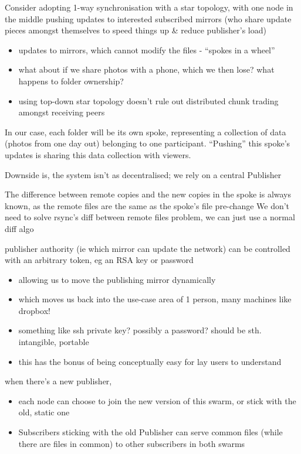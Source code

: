 \documentclass[12pt,a4paper,]{adreport}
\begin{document}
Consider adopting 1-way synchronisation with a star topology, with one
node in the middle pushing updates to interested subscribed mirrors (who
share update pieces amongst themselves to speed things up \& reduce
publisher's load)

\begin{itemize}
\itemsep1pt\parskip0pt
\item
  updates to mirrors, which cannot modify the files - ``spokes in a
  wheel''
\item
  what about if we share photos with a phone, which we then lose? what
  happens to folder ownership?
\item
  using top-down star topology doesn't rule out distributed chunk
  trading amongst receiving peers
\end{itemize}

In our case, each folder will be its own spoke, representing a
collection of data (photos from one day out) belonging to one
participant. ``Pushing'' this spoke's updates is sharing this data
collection with viewers.

Downside is, the system isn't as decentralised; we rely on a central
Publisher

The difference between remote copies and the new copies in the spoke is
always known, as the remote files are the same as the spoke's file
pre-change We don't need to solve rsync's diff between remote files
problem, we can just use a normal diff algo

publisher authority (ie which mirror can update the network) can be
controlled with an arbitrary token, eg an RSA key or password

\begin{itemize}
\itemsep1pt\parskip0pt
\item
  allowing us to move the publishing mirror dynamically
\item
  which moves us back into the use-case area of 1 person, many machines
  like dropbox!
\item
  something like ssh private key? possibly a password? should be sth.
  intangible, portable
\item
  this has the bonus of being conceptually easy for lay users to
  understand
\end{itemize}

when there's a new publisher,

\begin{itemize}
\itemsep1pt\parskip0pt
\item
  each node can choose to join the new version of this swarm, or stick
  with the old, static one
\item
  Subscribers sticking with the old Publisher can serve common files
  (while there are files in common) to other subscribers in both swarms
\end{itemize}
\end{document}
